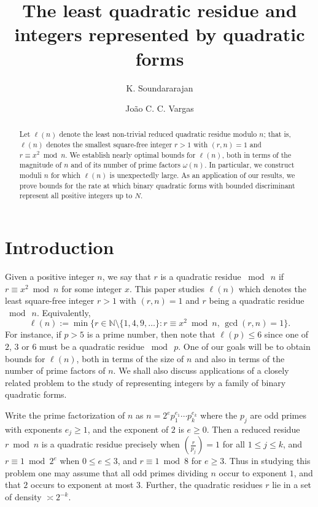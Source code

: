 \documentclass[11pt,makeidx, reqno]{amsart}
\title[]{The least quadratic residue and \\ integers represented by quadratic forms}
\author{K. Soundararajan}
\author{Jo\~ao C. C. Vargas}
\theoremstyle{mystyle}
\theoremstyle{definition}
\begin{document}
\begin{abstract} Let $\ell(n)$ denote the least non-trivial reduced quadratic residue modulo $n$; that is, 
$\ell(n)$ denotes the smallest square-free integer $r>1$ with $(r,n)=1$ and $r\equiv x^2 \bmod {n}$.   
We establish nearly optimal bounds for $\ell(n)$, both in terms of the magnitude of $n$ and of its number of prime factors $\omega(n)$. In particular, we construct moduli $n$ for which $\ell(n)$ is unexpectedly large. As an application of our results, we prove bounds for the rate at which binary quadratic forms with bounded discriminant represent all positive integers up to $N$.
 \end{abstract}
 
\maketitle

\section{Introduction}\label{intro}

\noindent Given a positive integer $n$, we say that $r$ is a quadratic residue $\bmod\  {n}$ if $r\equiv x^2 \bmod {n}$ for some integer $x$.  This paper studies $\ell(n)$ which denotes the least square-free integer $r>1$ with $(r,n)=1$ and $r$ being a quadratic residue $\bmod\ n$.  Equivalently,    
\begin{equation}\label{l(n)Defn}
    \ell(n) := \min\{ r \in \mathbb{N} \setminus \{1, 4, 9, \dots\}: r \equiv x^2 \bmod{n},\, \gcd(r, n) = 1\}.
\end{equation}
 For instance, if $p >5$ is a prime number, then note that $\ell(p)\le 6$ since one of $2$, $3$ or $6$ must be a quadratic residue $\bmod \ p$.  One of our goals will be to obtain bounds for $\ell(n)$, both in terms of the size of $n$ and also in terms of the number of prime factors of $n$.  We shall also discuss applications of a closely related problem to the study of representing integers by a family of binary quadratic forms. 

 
 Write the prime factorization of $n$ as $n=2^e p_1^{e_1} \cdots p_k^{e_k}$ where the $p_j$ are odd primes with exponents $e_j\ge 1$, and the exponent of $2$ is $e\ge 0$.   Then a reduced residue $r \bmod n$ is a quadratic residue precisely when $(\frac{r}{p_j}) =1$ for all $1\le j\le k$, and $r\equiv 1 \bmod{2^e}$ when $0\le e\le 3$, and $r\equiv 1 \bmod{8}$ for $e\ge 3$. Thus in studying this problem one may assume that all odd primes dividing $n$ occur to exponent $1$, and that $2$ occurs to exponent at most $3$.   Further, the quadratic residues $r$ lie in a set of density $\asymp 2^{-k}$.  
\end{document}

